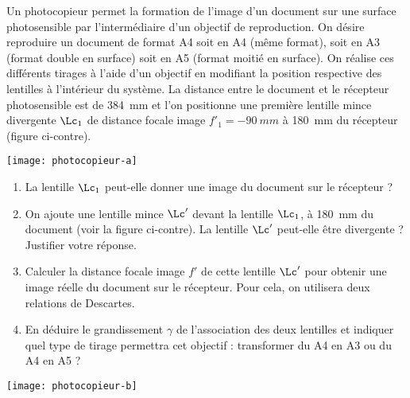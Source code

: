 \documentclass[a4paper, 12pt, final, garamond]{book}
\begin{document}
\begin{minipage}{0.55\linewidth}
Un photocopieur permet la formation de l'image d'un document sur une surface
photosensible par l'intermédiaire d'un objectif de reproduction. On désire
reproduire un document de format A4 soit en A4 (même format), soit en A3 (format
double en surface) soit en A5 (format moitié en surface). On réalise ces
différents tirages à l'aide d'un objectif en modifiant la position respective
des lentilles à l'intérieur du système. La distance entre le document et le
récepteur photosensible est de \SI{384}{mm} et l'on positionne une première lentille
mince divergente $\Lc_1$ de distance focale image $f'_1 = \SI{-90}{mm}$ à
\SI{180}{mm} du récepteur (figure ci-contre).
\end{minipage}
\begin{minipage}{0.45\linewidth}
    \begin{center}
        \texttt{[image: photocopieur-a]}
    \end{center}
\end{minipage}

\begin{minipage}{0.55\linewidth}
    \begin{enumerate}
        \item La lentille $\Lc_1$ peut-elle donner une image du document sur le
            récepteur ?
        \item On ajoute une lentille mince $\Lc'$ devant la lentille $\Lc_1$, à
            \SI{180}{mm} du document (voir la figure ci-contre). La lentille
            $\Lc'$ peut-elle être divergente ? Justifier votre réponse.
        \item Calculer la distance focale image $f'$ de cette lentille $\Lc'$
            pour obtenir une image réelle du document sur le récepteur. Pour
            cela, on utilisera deux relations de Descartes.
        \item En déduire le grandissement $\gamma$ de l'association des deux
            lentilles et indiquer quel type de tirage permettra cet objectif :
            transformer du A4 en A3 ou du A4 en A5 ?
    \end{enumerate}
\end{minipage}
\begin{minipage}{0.45\linewidth}
    \begin{center}
        \texttt{[image: photocopieur-b]}
    \end{center}
\end{minipage}
\end{document}

